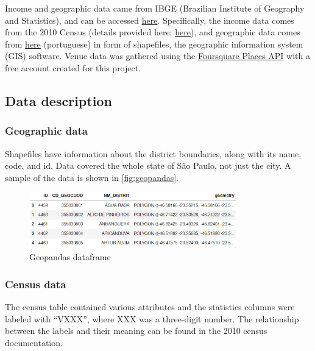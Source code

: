 \documentclass[12pt]{article}
\begin{document}
Income and geographic data came from IBGE (Brazilian Institute of Geography and
Statistics), and can be accessed
\href{https://www.ibge.gov.br/en/home-eng.html}{here}. Specifically, the
income data comes from the 2010 Census (details provided here:
\href{https://www.ibge.gov.br/en/statistics/social/income-expenditure-and-consumption/18391-2010-population-census.html?=&t=o-que-e}{here}),
and geographic data comes from
\href{https://www.ibge.gov.br/geociencias/organizacao-do-territorio/malhas-territoriais/26565-malhas-de-setores-censitarios-divisoes-intramunicipais.html?=&t=o-que-e}{here}
(portuguese) in form of shapefiles, the geographic information system (GIS)
software.  Venue data was gathered using the
\href{https://developer.foursquare.com/places}{Foursquare Places API} with a
free account created for this project.

\subsection{Data description}

\subsubsection{Geographic data}

Shapefiles have information about the district boundaries, along with
its name, code, and id. Data covered the whole state of São Paulo, not just
the city. A sample of the data is shown in \autoref{fig:geopandas}.

\begin{figure}[h]
        \centering
        \includegraphics[width=0.8\textwidth]{geopandas.png}
        \caption{Geopandas dataframe\label{fig:geopandas}}
\end{figure}

\subsubsection{Census data}

The census table contained various attributes and the statistics columns were
labeled with ``VXXX'', where XXX was a three-digit number. The relationship
between the labels and their meaning can be found in the 2010 census documentation.
\end{document}
